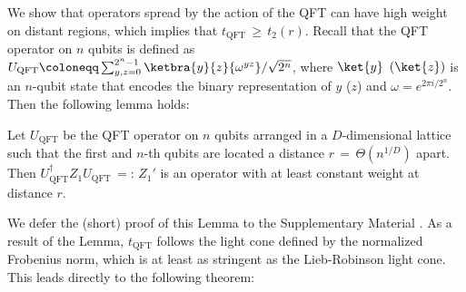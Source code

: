 We show that operators spread by the action of the QFT can have high weight on distant regions,
which implies that $t_\mathrm{QFT}$\,$\geq$\,$t_2(r)$.
Recall that the QFT operator on $n$ qubits is defined as $U_\mathrm{QFT} \coloneqq \sum_{y,z=0}^{2^n-1} \ketbra{y}{z} {\omega^{yz}}/{\sqrt{2^n}}$, where $\ket{y}$ $(\ket{z})$ is an $n$-qubit state that encodes the binary representation of $y$ ($z$) and $\omega = e^{2\pi i/2^n}$.
Then the following lemma holds:
\begin{lemma*} \label{lem_qft_weight}
Let $U_\mathrm{QFT}$ be the QFT operator on $n$ qubits arranged in a $D$-dimensional lattice such that the first and $n$-th qubits are located a distance $r$\,$=$\,$\Theta(n^{1/D})$ apart.
Then $U_\mathrm{QFT}^\dag Z_1 U_\mathrm{QFT}$\,$=:$\,$Z_1' $ is an operator with at least constant weight at distance $r$.
\end{lemma*}

We defer the (short) proof of this Lemma to the Supplementary Material \cite{SM}.
As a result of the Lemma, $t_\mathrm{QFT}$ follows the light cone defined by the normalized Frobenius norm, which is at least as stringent as the Lieb-Robinson light cone.
This leads directly to the following theorem:
%

